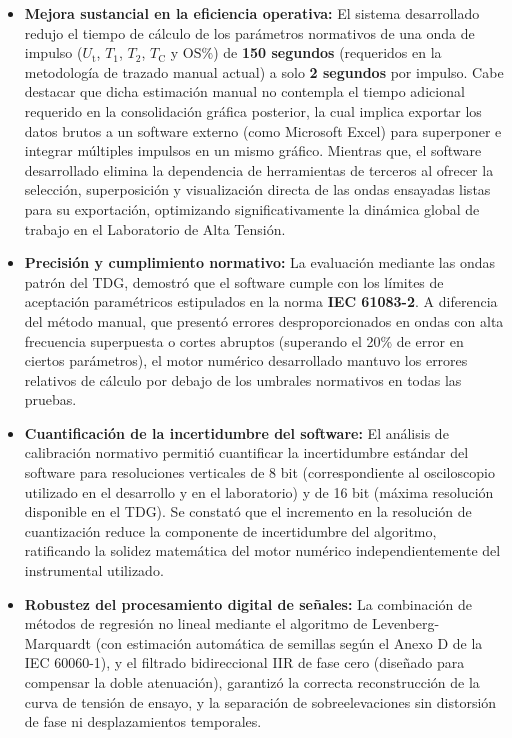 \begin{itemize}
    \item \textbf{Mejora sustancial en la eficiencia operativa:} El sistema desarrollado redujo el tiempo de cálculo de los parámetros normativos de una onda de impulso ($U_\text{t}$, $T_1$, $T_2$, $T_\text{C}$ y $\text{OS}\%$) de \textbf{150 segundos} (requeridos en la metodología de trazado manual actual) a solo \textbf{2 segundos} por impulso.
    Cabe destacar que dicha estimación manual no contempla el tiempo adicional requerido en la consolidación gráfica posterior, la cual implica exportar los datos brutos a un software externo (como Microsoft Excel) para superponer e integrar múltiples impulsos en un mismo gráfico. Mientras que, el software desarrollado elimina la dependencia de herramientas de terceros al ofrecer la selección, superposición y visualización directa de las ondas ensayadas listas para su exportación, optimizando significativamente la dinámica global de trabajo en el Laboratorio de Alta Tensión.

    \item \textbf{Precisión y cumplimiento normativo:} La evaluación mediante las ondas patrón del TDG, demostró que el software cumple con los límites de aceptación paramétricos estipulados en la norma \textbf{IEC 61083-2}. A diferencia del método manual, que presentó errores desproporcionados en ondas con alta frecuencia superpuesta o cortes abruptos (superando el \num{20}\% de error en ciertos parámetros), el motor numérico desarrollado mantuvo los errores relativos de cálculo por debajo de los umbrales normativos en todas las pruebas.

    \item \textbf{Cuantificación de la incertidumbre del software:} El análisis de calibración normativo permitió cuantificar la incertidumbre estándar del software para resoluciones verticales de 8 bit (correspondiente al osciloscopio utilizado en el desarrollo y en el laboratorio) y de 16 bit (máxima resolución disponible en el TDG). Se constató que el incremento en la resolución de cuantización reduce la componente de incertidumbre del algoritmo, ratificando la solidez matemática del motor numérico independientemente del instrumental utilizado.

    \item \textbf{Robustez del procesamiento digital de señales:} La combinación de métodos de regresión no lineal mediante el algoritmo de Levenberg-Marquardt (con estimación automática de semillas según el Anexo D de la IEC 60060-1), y el filtrado bidireccional IIR de fase cero (diseñado para compensar la doble atenuación), garantizó la correcta reconstrucción de la curva de tensión de ensayo, y la separación de sobreelevaciones sin distorsión de fase ni desplazamientos temporales.


\end{itemize}

